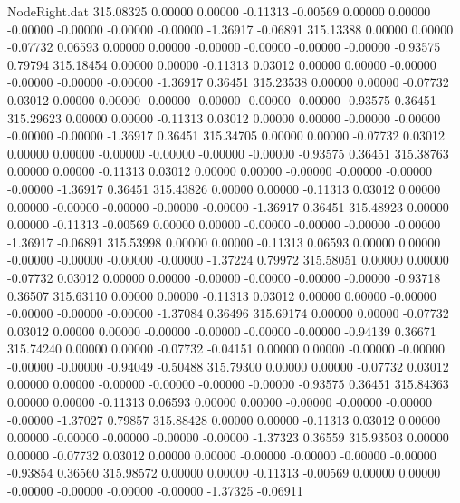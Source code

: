 \begin{filecontents}{NodeRight.dat}
 315.08325    0.00000    0.00000    -0.11313   -0.00569    0.00000    0.00000   -0.00000   -0.00000   -0.00000   -0.00000   -1.36917   -0.06891
 315.13388    0.00000    0.00000    -0.07732    0.06593    0.00000    0.00000   -0.00000   -0.00000   -0.00000   -0.00000   -0.93575    0.79794
 315.18454    0.00000    0.00000    -0.11313    0.03012    0.00000    0.00000   -0.00000   -0.00000   -0.00000   -0.00000   -1.36917    0.36451
 315.23538    0.00000    0.00000    -0.07732    0.03012    0.00000    0.00000   -0.00000   -0.00000   -0.00000   -0.00000   -0.93575    0.36451
 315.29623    0.00000    0.00000    -0.11313    0.03012    0.00000    0.00000   -0.00000   -0.00000   -0.00000   -0.00000   -1.36917    0.36451
 315.34705    0.00000    0.00000    -0.07732    0.03012    0.00000    0.00000   -0.00000   -0.00000   -0.00000   -0.00000   -0.93575    0.36451
 315.38763    0.00000    0.00000    -0.11313    0.03012    0.00000    0.00000   -0.00000   -0.00000   -0.00000   -0.00000   -1.36917    0.36451
 315.43826    0.00000    0.00000    -0.11313    0.03012    0.00000    0.00000   -0.00000   -0.00000   -0.00000   -0.00000   -1.36917    0.36451
 315.48923    0.00000    0.00000    -0.11313   -0.00569    0.00000    0.00000   -0.00000   -0.00000   -0.00000   -0.00000   -1.36917   -0.06891
 315.53998    0.00000    0.00000    -0.11313    0.06593    0.00000    0.00000   -0.00000   -0.00000   -0.00000   -0.00000   -1.37224    0.79972
 315.58051    0.00000    0.00000    -0.07732    0.03012    0.00000    0.00000   -0.00000   -0.00000   -0.00000   -0.00000   -0.93718    0.36507
 315.63110    0.00000    0.00000    -0.11313    0.03012    0.00000    0.00000   -0.00000   -0.00000   -0.00000   -0.00000   -1.37084    0.36496
 315.69174    0.00000    0.00000    -0.07732    0.03012    0.00000    0.00000   -0.00000   -0.00000   -0.00000   -0.00000   -0.94139    0.36671
 315.74240    0.00000    0.00000    -0.07732   -0.04151    0.00000    0.00000   -0.00000   -0.00000   -0.00000   -0.00000   -0.94049   -0.50488
 315.79300    0.00000    0.00000    -0.07732    0.03012    0.00000    0.00000   -0.00000   -0.00000   -0.00000   -0.00000   -0.93575    0.36451
 315.84363    0.00000    0.00000    -0.11313    0.06593    0.00000    0.00000   -0.00000   -0.00000   -0.00000   -0.00000   -1.37027    0.79857
 315.88428    0.00000    0.00000    -0.11313    0.03012    0.00000    0.00000   -0.00000   -0.00000   -0.00000   -0.00000   -1.37323    0.36559
 315.93503    0.00000    0.00000    -0.07732    0.03012    0.00000    0.00000   -0.00000   -0.00000   -0.00000   -0.00000   -0.93854    0.36560
 315.98572    0.00000    0.00000    -0.11313   -0.00569    0.00000    0.00000   -0.00000   -0.00000   -0.00000   -0.00000   -1.37325   -0.06911

\end{filecontents}
